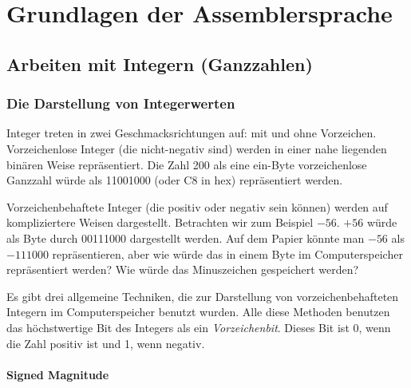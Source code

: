 
\chapter{Grundlagen der Assemblersprache}

\section{Arbeiten mit Integern (Ganzzahlen)
  }

\subsection{Die Darstellung von Integerwerten }

 Integer treten in zwei
Geschmacksrichtungen auf: mit und ohne Vorzeichen. Vorzeichenlose
Integer (die nicht-negativ sind) werden in einer nahe liegenden
bin\"{a}ren Weise repr\"{a}sentiert. Die Zahl 200 als eine ein-Byte
vorzeichenlose Ganzzahl w\"{u}rde als 11001000 (oder C8 in hex)
repr\"{a}sentiert werden. 

 Vorzeichenbehaftete Integer (die
positiv oder negativ sein k\"{o}nnen) werden auf kompliziertere Weisen
dargestellt. Betrachten wir zum Beispiel $-56$. $+56$ w\"{u}rde als Byte
durch 00111000 dargestellt werden. Auf dem Papier k\"{o}nnte man $-56$
als $-111000$ repr\"{a}sentieren, aber wie w\"{u}rde das in einem Byte im
Computerspeicher repr\"{a}sentiert werden? Wie w\"{u}rde das Minuszeichen
gespeichert werden?

Es gibt drei allgemeine Techniken, die zur Darstellung von
vorzeichenbehafteten Integern im Computerspeicher benutzt wurden.
Alle diese Methoden benutzen das h\"{o}chstwertige Bit des Integers als
ein \emph{Vorzeichenbit}. 
 Dieses Bit ist 0, wenn die Zahl positiv ist
und 1, wenn negativ.

\subsubsection{Signed Magnitude
  }

